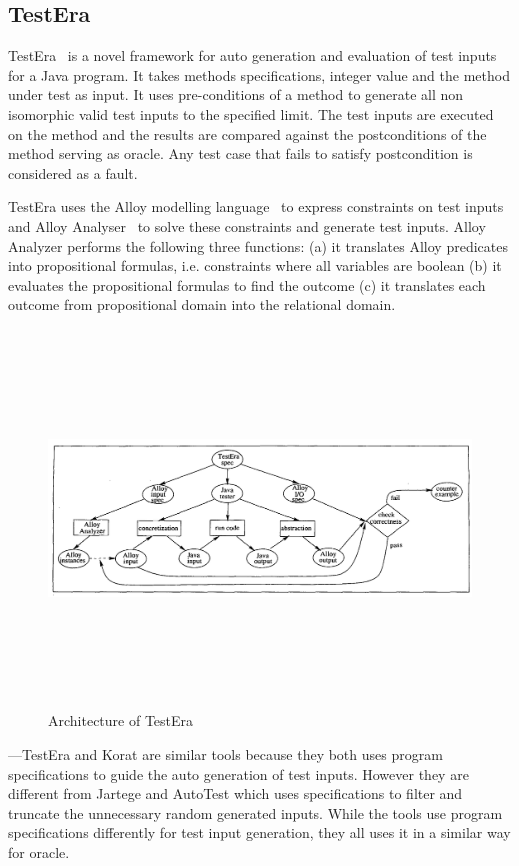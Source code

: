 \subsection{TestEra}
TestEra~\cite{Khurshid2004} is a novel framework for auto generation and evaluation of test inputs for a Java program. It takes methods specifications, integer value and the method under test as input. It uses pre-conditions of a method to generate all non isomorphic valid test inputs to the specified limit. The test inputs are executed on the method and the results are compared against the postconditions of the method serving as oracle. Any test case that fails to satisfy postcondition is considered as a fault. 

TestEra uses the Alloy modelling language~\cite{jackson2001micromodularity} to express constraints on test inputs and Alloy Analyser~\cite{jackson2000alcoa} to solve these constraints and generate test inputs. Alloy Analyzer performs the following three functions: (a) it translates Alloy predicates into propositional formulas, i.e. constraints where all variables are boolean (b) it evaluates the propositional formulas to find the outcome (c) it translates each outcome from propositional domain into the relational domain.

\begin{figure}[h]
	\centering
	\includegraphics[width=15cm, height=10cm]{chapter3/testera.png}
	\caption{Architecture of TestEra ~\cite{Khurshid2004}}
	\label{fig:testera}
\end{figure}


---TestEra and Korat are similar tools because they both uses program specifications to guide the auto generation of test inputs. However they are different from Jartege and AutoTest which uses specifications to filter and truncate the unnecessary random generated inputs. While the tools use program specifications differently for test input generation, they all uses it in a similar way for oracle. 


